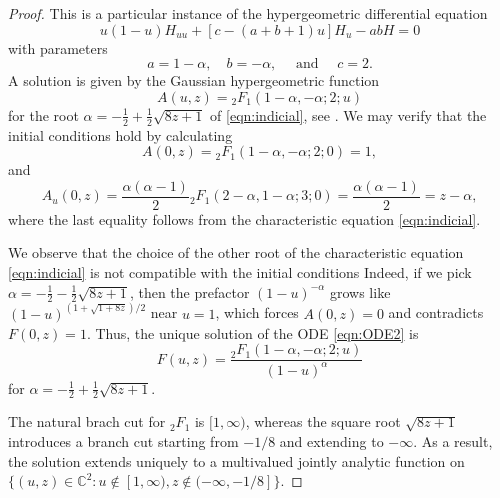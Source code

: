 \documentclass[11pt,a4paper]{article}
\numberwithin{equation}{section}
\def\CC{\mathbb{C}}
\begin{document}
\begin{proof}
This is a particular instance of the hypergeometric differential equation
$$
u(1-u)H_{uu} + [c-(a+b+1)u]H_u - ab H = 0
$$
with parameters
\begin{equation*}
    a = 1-\alpha, \quad 
    b = -\alpha, \quad \text{ and }\quad 
    c = 2.
\end{equation*}
A solution is given by the Gaussian hypergeometric function
\begin{equation*}
    A(u,z) = {_2F_1}(1-\alpha,-\alpha;2;u)
\end{equation*}
for the root $\alpha=-\tfrac{1}{2}+\tfrac{1}{2}\sqrt{8z+1}$ of \eqref{eqn:indicial}, see \cite[Section 5.3]{Temme}. We may verify that the initial conditions hold by calculating
\begin{equation*}
    A(0,z) = {_2F_1}(1-\alpha,-\alpha;2;0) = 1,
\end{equation*}
and
\begin{equation*}
    A_u(0,z) = \frac{\alpha(\alpha-1)}{2} {_2F_1}(2-\alpha,1-\alpha;3;0) = \frac{\alpha(\alpha-1)}{2} = z-\alpha,
\end{equation*}
where the last equality follows from the characteristic equation \eqref{eqn:indicial}. 

We observe that the choice of the other root of the characteristic equation \eqref{eqn:indicial} is not compatible with the initial conditions
Indeed, if we pick $\alpha=-\tfrac{1}{2}-\tfrac{1}{2}\sqrt{8z+1}$, then the prefactor $(1-u)^{-\alpha}$ grows like $(1-u)^{(1+\sqrt{1+8z})/2}$ near $u=1$, which forces $A(0,z)=0$ and contradicts $F(0,z)=1$. Thus, the unique solution of the ODE \eqref{eqn:ODE2} is
\begin{equation*}
    F(u,z) = \frac{{_2F_1}(1-\alpha,-\alpha;2;u)}{(1-u)^{\alpha}}
\end{equation*}
for $\alpha=-\tfrac{1}{2}+\tfrac{1}{2}\sqrt{8z+1}$. 

The natural brach cut for ${_2F_1}$ is $[1,\infty)$, whereas the square root $\sqrt{8z+1}$ introduces a  branch cut starting from $-1/8$ and extending to $-\infty$. As a result, the solution extends uniquely to a multivalued jointly analytic function on $\{(u,z)\in\CC^2:u\notin [1,\infty),z\notin(-\infty,-1/8]\}$.
\end{proof}
\end{document}

